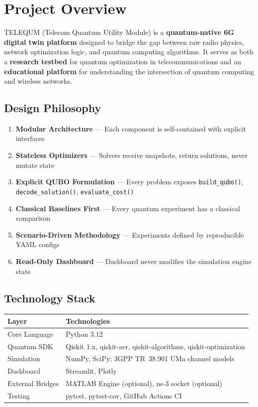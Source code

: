 \documentclass[11pt,a4paper]{article}
\begin{document}
\tableofcontents
\newpage

\section{Project Overview}

TELEQUM (Telecom Quantum Utility Module) is a \textbf{quantum-native 6G digital twin platform} designed to bridge the gap between raw radio physics, network optimization logic, and quantum computing algorithms. It serves as both a \textbf{research testbed} for quantum optimization in telecommunications and an \textbf{educational platform} for understanding the intersection of quantum computing and wireless networks.

\subsection{Design Philosophy}

\begin{enumerate}[label=\textbf{R\arabic*}]
  \item \textbf{Modular Architecture} — Each component is self-contained with explicit interfaces
  \item \textbf{Stateless Optimizers} — Solvers receive snapshots, return solutions, never mutate state
  \item \textbf{Explicit QUBO Formulation} — Every problem exposes \texttt{build\_qubo()}, \texttt{decode\_solution()}, \texttt{evaluate\_cost()}
  \item \textbf{Classical Baselines First} — Every quantum experiment has a classical comparison
  \item \textbf{Scenario-Driven Methodology} — Experiments defined by reproducible YAML configs
  \item \textbf{Read-Only Dashboard} — Dashboard never modifies the simulation engine state
\end{enumerate}

\subsection{Technology Stack}

\begin{tabularx}{\textwidth}{lX}
  \toprule
  \textbf{Layer} & \textbf{Technologies} \\
  \midrule
  Core Language & Python 3.12 \\
  Quantum SDK & Qiskit 1.x, qiskit-aer, qiskit-algorithms, qiskit-optimization \\
  Simulation & NumPy, SciPy; 3GPP TR~38.901 UMa channel models \\
  Dashboard & Streamlit, Plotly \\
  External Bridges & MATLAB Engine (optional), ns-3 socket (optional) \\
  Testing & pytest, pytest-cov, GitHub Actions CI \\
  \bottomrule
\end{tabularx}
\end{document}
